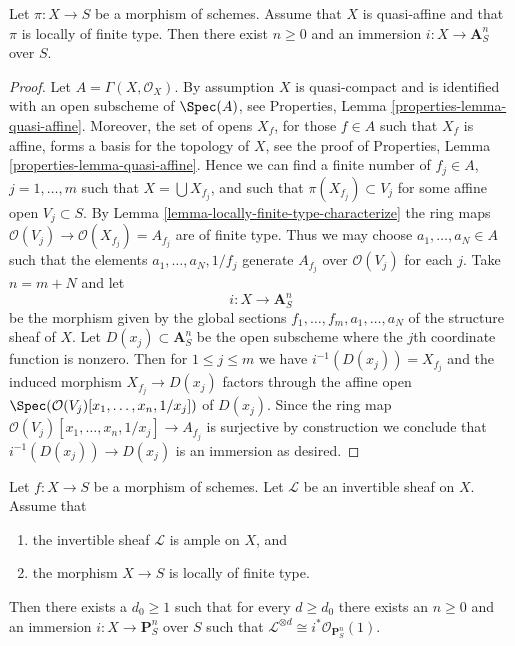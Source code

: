 \begin{lemma}
\label{lemma-quasi-affine-finite-type-over-S}
Let $\pi : X \to S$ be a morphism of schemes.
Assume that $X$ is quasi-affine and that $\pi$ is locally of finite type.
Then there exist $n \geq 0$ and an immersion $i : X \to \mathbf{A}^n_S$
over $S$.
\end{lemma}

\begin{proof}
Let $A = \Gamma(X, \mathcal{O}_X)$. By assumption $X$ is quasi-compact
and is identified with an open subscheme of $\Spec(A)$, see
Properties, Lemma \ref{properties-lemma-quasi-affine}.
Moreover, the set of opens $X_f$, for those $f \in A$ such that $X_f$ is
affine, forms a basis for the topology of $X$, see the proof of
Properties, Lemma \ref{properties-lemma-quasi-affine}.
Hence we can find a finite number of $f_j \in A$, $j = 1, \ldots, m$ such that
$X = \bigcup X_{f_j}$, and such that $\pi(X_{f_j}) \subset V_j$ for
some affine open $V_j \subset S$. By
Lemma \ref{lemma-locally-finite-type-characterize}
the ring maps $\mathcal{O}(V_j) \to \mathcal{O}(X_{f_j}) = A_{f_j}$
are of finite type. Thus we may choose $a_1, \ldots, a_N \in A$ such that
the elements $a_1, \ldots, a_N, 1/f_j$ generate
$A_{f_j}$ over $\mathcal{O}(V_j)$ for each $j$. Take $n = m + N$ and
let
$$
i : X \longrightarrow \mathbf{A}^n_S
$$
be the morphism given by the global sections
$f_1, \ldots, f_m, a_1, \ldots, a_N$ of the structure sheaf of $X$.
Let $D(x_j) \subset \mathbf{A}^n_S$ be the open subscheme where the
$j$th coordinate function is nonzero.
Then for $1 \leq j \leq m$ we have $i^{-1}(D(x_j)) = X_{f_j}$ and
the induced morphism $X_{f_j} \to D(x_j)$ factors through the affine
open $\Spec(\mathcal{O}(V_j)[x_1, \ldots, x_n, 1/x_j])$
of $D(x_j)$. Since the ring map
$\mathcal{O}(V_j)[x_1, \ldots, x_n, 1/x_j] \to A_{f_j}$ is
surjective by construction we conclude that $i^{-1}(D(x_j)) \to D(x_j)$
is an immersion as desired.
\end{proof}

\begin{lemma}
\label{lemma-quasi-projective-finite-type-over-S}
Let $f : X \to S$ be a morphism of schemes.
Let $\mathcal{L}$ be an invertible sheaf on $X$.
Assume that
\begin{enumerate}
\item the invertible sheaf $\mathcal{L}$ is ample on $X$, and
\item the morphism $X \to S$ is locally of finite type.
\end{enumerate}
Then there exists a $d_0 \geq 1$ such that for every $d \geq d_0$
there exists an $n \geq 0$ and an immersion
$i : X \to \mathbf{P}^n_S$ over $S$ such that
$\mathcal{L}^{\otimes d} \cong i^*\mathcal{O}_{\mathbf{P}^n_S}(1)$.
\end{lemma}

